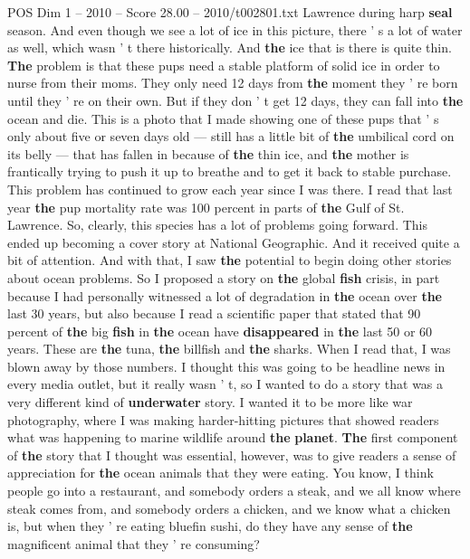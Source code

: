 \begin{textsample}{POS Dim 1 – 2010 – Score 28.00 – 2010/t002801.txt}
Lawrence during harp \textbf{seal} season.
And even though we see a lot of ice in this picture, there ' s a lot of water as well, which wasn ' t there historically.
And \textbf{the} ice that is there is quite thin. \textbf{The} problem is that these pups need a stable platform of solid ice in order to nurse from their moms.
They only need 12 days from \textbf{the} moment they ' re born until they ' re on their own.
But if they don ' t get 12 days, they can fall into \textbf{the} ocean and die.
This is a photo that I made showing one of these pups that ' s only about five or seven days old — still has a little bit of \textbf{the} umbilical cord on its belly — that has fallen in because of \textbf{the} thin ice, and \textbf{the} mother is frantically trying to push it up to breathe and to get it back to stable purchase.
This problem has continued to grow each year since I was there.
I read that last year \textbf{the} pup mortality rate was 100 percent in parts of \textbf{the} Gulf of St.
Lawrence.
So, clearly, this species has a lot of problems going forward.
This ended up becoming a cover story at National Geographic.
And it received quite a bit of attention.
And with that, I saw \textbf{the} potential to begin doing other stories about ocean problems.
So I proposed a story on \textbf{the} global \textbf{fish} crisis, in part because I had personally witnessed a lot of degradation in \textbf{the} ocean over \textbf{the} last 30 years, but also because I read a scientific paper that stated that 90 percent of \textbf{the} big \textbf{fish} in \textbf{the} ocean have \textbf{disappeared} in \textbf{the} last 50 or 60 years.
These are \textbf{the} tuna, \textbf{the} billfish and \textbf{the} sharks.
When I read that, I was blown away by those numbers.
I thought this was going to be headline news in every media outlet, but it really wasn ' t, so I wanted to do a story that was a very different kind of \textbf{underwater} story.
I wanted it to be more like war photography, where I was making harder-hitting pictures that showed readers what was happening to marine wildlife around \textbf{the} \textbf{planet}. \textbf{The} first component of \textbf{the} story that I thought was essential, however, was to give readers a sense of appreciation for \textbf{the} ocean animals that they were eating.
You know, I think people go into a restaurant, and somebody orders a steak, and we all know where steak comes from, and somebody orders a chicken, and we know what a chicken is, but when they ' re eating bluefin sushi, do they have any sense of \textbf{the} magnificent animal that they ' re consuming?

\end{textsample}
